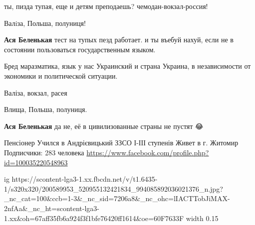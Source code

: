 

ты, пизда тупая, еще и детям преподаешь? чемодан-вокзал-россия!

\begin{itemize}

Валiза, Польша, полуниця!


\textbf{Ася Беленькая} тест на тупых пезд работает. и ты въебуй нахуй, если не в состоянии пользоваться государственным языком.
\end{itemize}


Бред маразматика, язык у нас Украинский и страна Украина, в независимости от экономики и политической ситуации.


Валіза, вокзал, расея

\begin{itemize}

Влища, Польша, полуниця.


\textbf{Ася Беленькая} да не, её в цивилизованные страны не пустят 😂
\end{itemize}

Пенсіонер
Учился в Андрієвицький ЗЗСО І-ІІІ ступенів
Живет в г. Житомир
Подписчики: 283 человека
\url{https://www.facebook.com/profile.php?id=100035220548963}\par
\ifcmt
  ig https://scontent-lga3-1.xx.fbcdn.net/v/t1.6435-1/s320x320/200589953_520955132421834_994085892036021376_n.jpg?_nc_cat=100&ccb=1-3&_nc_sid=7206a8&_nc_ohc=lIACTTobJiMAX-2nfAa&_nc_ht=scontent-lga3-1.xx&oh=67aff35fb6a924f3f1bfe76420ff1614&oe=60F7633F
  width 0.15

